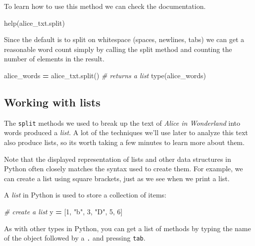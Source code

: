 \documentclass[]{book}
\newenvironment{Shaded}{\begin{snugshade}}{\end{snugshade}}
\newcommand{\BuiltInTok}[1]{#1}
\newcommand{\CommentTok}[1]{\textcolor[rgb]{0.56,0.35,0.01}{\textit{#1}}}
\newcommand{\DecValTok}[1]{\textcolor[rgb]{0.00,0.00,0.81}{#1}}
\newcommand{\NormalTok}[1]{#1}
\newcommand{\OperatorTok}[1]{\textcolor[rgb]{0.81,0.36,0.00}{\textbf{#1}}}
\newcommand{\StringTok}[1]{\textcolor[rgb]{0.31,0.60,0.02}{#1}}
\begin{document}
To learn how to use this method we can check the documentation.

\begin{Shaded}
\begin{Highlighting}[]
\BuiltInTok{help}\NormalTok{(alice_txt.split)}
\end{Highlighting}
\end{Shaded}

Since the default is to split on whitespace (spaces, newlines, tabs) we can get a reasonable word count simply by calling the split method and counting the number of elements in the result.

\begin{Shaded}
\begin{Highlighting}[]
\NormalTok{alice_words }\OperatorTok{=}\NormalTok{ alice_txt.split() }\CommentTok{# returns a list}
\BuiltInTok{type}\NormalTok{(alice_words)}
\end{Highlighting}
\end{Shaded}

\hypertarget{working-with-lists}{%
\subsection{Working with lists}\label{working-with-lists}}

The \texttt{split} methods we used to break up the text of \emph{Alice in Wonderland} into words produced a \emph{list}. A lot of the techniques we'll use later to analyze this text also produce lists, so its worth taking a few minutes to learn more about them.

Note that the displayed representation of lists and other data structures in Python often closely matches the syntax used to create them. For example, we can create a list using square brackets, just as we see when we print a list.

A \emph{list} in Python is used to store a collection of items:

\begin{Shaded}
\begin{Highlighting}[]
\CommentTok{# create a list}
\NormalTok{y }\OperatorTok{=}\NormalTok{ [}\DecValTok{1}\NormalTok{, }\StringTok{"b"}\NormalTok{, }\DecValTok{3}\NormalTok{, }\StringTok{"D"}\NormalTok{, }\DecValTok{5}\NormalTok{, }\DecValTok{6}\NormalTok{]}
\end{Highlighting}
\end{Shaded}

As with other types in Python, you can get a list of methods by typing the name of the object followed by a \texttt{.} and pressing \texttt{tab}.
\end{document}
